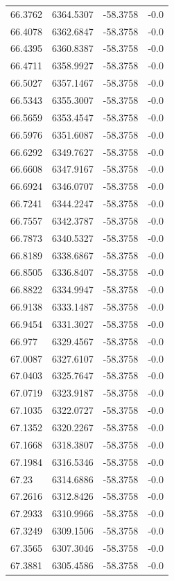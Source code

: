 \begin{table}[H]
\begin{tabular}{llll}
66.3762 & 6364.5307 & -58.3758 & -0.0 \\
66.4078 & 6362.6847 & -58.3758 & -0.0 \\
66.4395 & 6360.8387 & -58.3758 & -0.0 \\
66.4711 & 6358.9927 & -58.3758 & -0.0 \\
66.5027 & 6357.1467 & -58.3758 & -0.0 \\
66.5343 & 6355.3007 & -58.3758 & -0.0 \\
66.5659 & 6353.4547 & -58.3758 & -0.0 \\
66.5976 & 6351.6087 & -58.3758 & -0.0 \\
66.6292 & 6349.7627 & -58.3758 & -0.0 \\
66.6608 & 6347.9167 & -58.3758 & -0.0 \\
66.6924 & 6346.0707 & -58.3758 & -0.0 \\
66.7241 & 6344.2247 & -58.3758 & -0.0 \\
66.7557 & 6342.3787 & -58.3758 & -0.0 \\
66.7873 & 6340.5327 & -58.3758 & -0.0 \\
66.8189 & 6338.6867 & -58.3758 & -0.0 \\
66.8505 & 6336.8407 & -58.3758 & -0.0 \\
66.8822 & 6334.9947 & -58.3758 & -0.0 \\
66.9138 & 6333.1487 & -58.3758 & -0.0 \\
66.9454 & 6331.3027 & -58.3758 & -0.0 \\
66.977 & 6329.4567 & -58.3758 & -0.0 \\
67.0087 & 6327.6107 & -58.3758 & -0.0 \\
67.0403 & 6325.7647 & -58.3758 & -0.0 \\
67.0719 & 6323.9187 & -58.3758 & -0.0 \\
67.1035 & 6322.0727 & -58.3758 & -0.0 \\
67.1352 & 6320.2267 & -58.3758 & -0.0 \\
67.1668 & 6318.3807 & -58.3758 & -0.0 \\
67.1984 & 6316.5346 & -58.3758 & -0.0 \\
67.23 & 6314.6886 & -58.3758 & -0.0 \\
67.2616 & 6312.8426 & -58.3758 & -0.0 \\
67.2933 & 6310.9966 & -58.3758 & -0.0 \\
67.3249 & 6309.1506 & -58.3758 & -0.0 \\
67.3565 & 6307.3046 & -58.3758 & -0.0 \\
67.3881 & 6305.4586 & -58.3758 & -0.0 \\

\end{tabular}
\end{table}
